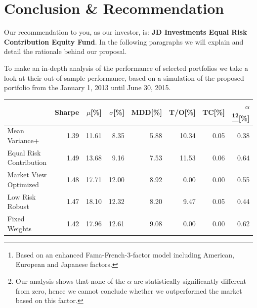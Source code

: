 \documentclass[11pt, parskip=full, DIV=14, headings=small, footsepline, footinclude=false, headsepline]{scrreprt}
\newlength{\oldintextsep}
\begin{document}
\setlength{\intextsep}{\oldintextsep}
\chapter{Conclusion \& Recommendation}
Our recommendation to you, as our investor, is: \textbf{JD Investments Equal Risk Contribution Equity Fund}. 
In the following paragraphs we will explain and detail the rationale behind our proposal.

To make an in-depth analysis of the performance of selected portfolios we take a look at their out-of-sample performance, based on a simulation of the proposed portfolio from the January 1, 2013 until June 30, 2015.

\begin{table}[ht]
\centering
\begin{tabular}{lrrrrrrr}
\toprule
                      & Sharpe & $\mu$[\%] &$\sigma$[\%]& MDD[\%]& T/O[\%] & TC[\%] & $\alpha$\footnote{Based on an enhanced Fama-French-3-factor model including American, European and Japanese factors.}\footnote{Our analysis shows that none of the $\alpha$ are statistically significantly different from zero, hence we cannot conclude whether we outperformed the market based on this factor.}[\%] \\ 
\midrule
 Mean Variance+ & 1.39 & 11.61 & 8.35 & 5.88 & 10.34 & 0.05 & 0.38 \\
 Equal Risk Contribution& 1.49 & 13.68 & 9.16 & 7.53 & 11.53 & 0.06 & 0.64 \\ 
 Market View Optimized & 1.48 & 17.71 & 12.00 & 8.92 & 0.00 & 0.00 & 0.55 \\ 
 Low Risk Robust & 1.47 & 18.10 & 12.32 & 8.20 & 9.47 & 0.05 & 0.44 \\ 
 Fixed Weights & 1.42 & 17.96 & 12.61 & 9.08 & 0.00 & 0.00 & 0.62 \\ 
 \bottomrule
\end{tabular}
\end{table}
\end{document}
